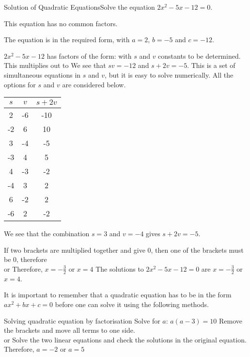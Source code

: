 \begin{wex}{Solution of Quadratic Equations}{Solve the equation $2x^{2} - 5x - 12 = 0$.}
{
This equation has no common factors.

The equation is in the required form, with $a=2$, $b=-5$ and $c=-12$.

$2x^{2} - 5x - 12$ has factors of the form:
with $s$ and $v$ constants to be determined.
This multiplies out to
We see that $sv = -12$ and $s + 2v = -5$. This is a set of simultaneous equations in $s$ and $v$, but it is easy to solve numerically. All the options for $s$ and $v$ are considered below.

\begin{center}
\begin{tabular}{|c|c|c|}\hline\hline
$s$ & $v$ & $s + 2v$ \\\hline\hline
2 & -6 & -10 \\
-2 & 6 & 10 \\
3 & -4 & -5 \\
-3 & 4 & 5 \\
4 & -3 & -2 \\
-4 & 3 & 2 \\
6 & -2 & 2 \\
-6 & 2 & -2 \\\hline
\end{tabular}
\end{center}
We see that the combination $s = 3$ and $v = -4$ gives $s + 2v = -5$.

If two brackets are multiplied together and give 0, then one of the brackets must be 0,  therefore\\
or
Therefore, $x=-\frac{3}{2}$ or $x=4$
The solutions to $2x^{2} - 5x - 12 = 0$ are $x=-\frac{3}{2}$ or $x=4$.
}\end{wex}

It is important to remember that a quadratic equation has to be in the form    $ax^2+bx+c = 0$ before one can solve it using the following methods.

\begin{wex}{Solving quadratic equation by factorisation}
{Solve for $a$: $a(a-3)=10$}{
Remove the brackets and move all terms to one side.\\
or
Solve the two linear equations and check the solutions in the original equation.
Therefore, $a = -2$ or $a = 5$
}
\end{wex}

